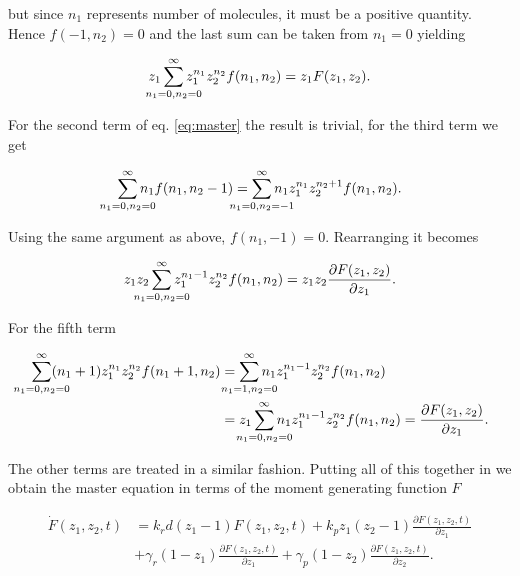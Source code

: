 but since $n_1$ represents number of molecules, it must be a positive quantity. Hence $f(-1,n_2)=0$ and the last sum can be taken from $n_1=0$ yielding

\begin{equation*}
  z_1 \sum_{\mathclap{n_1=0,n_2=0}}^\infty z_1^{n_1}z_2^{n_2}f(n_1,n_2) = z_1F(z_1,z_2).
\end{equation*}

For the second term of eq. \eqref{eq:master} the result is trivial, for the third term we get

\begin{equation*}
  \sum_{\mathclap{n_1=0,n_2=0}}^\infty n_1f(n_1,n_2-1) = \sum_{\mathclap{n_1=0,n_2=-1}}^\infty n_1z_1^{n_1}z_2^{n_2+1}f(n_1,n_2).
\end{equation*}

Using the same argument as above, $f(n_1,-1) = 0$. Rearranging it becomes

\begin{equation*}
  z_1 z_2 \sum_{\mathclap{n_1=0,n_2=0}}^\infty z_1^{n_1-1}z_2^{n_2}f(n_1,n_2) = z_1 z_2 \frac{\partial F(z_1,z_2)}{\partial z_1}.
\end{equation*}

For the fifth term

\begin{equation*}
  \begin{split}
    \sum_{\mathclap{n_1=0,n_2=0}}^\infty (n_1+1)z_1^{n_1}z_2^{n_2}f(n_1+1,n_2) &= \sum_{\mathclap{n_1=1,n_2=0}}^\infty n_1z_1^{n_1-1}z_2^{n_2}f(n_1,n_2)\\ 
    &= z_1 \sum_{\mathclap{n_1=0,n_2=0}}^\infty n_1z_1^{n_1-1}z_2^{n_2}f(n_1,n_2) = \frac{\partial F(z_1,z_2)}{\partial z_1}.
  \end{split}
\end{equation*}

The other terms are treated in a similar fashion. Putting all of this together in we obtain the master equation in terms of the moment generating function $F$

\begin{equation}
  \label{eq:masterF}
  \begin{split}
    \dot{F}(z_1,z_2,t) &= k_rd(z_1-1)F(z_1,z_2,t) + k_pz_1(z_2-1)\frac{\partial F(z_1,z_2,t)}{\partial z_1} \\
    &+ \gamma_r(1-z_1)\frac{\partial F(z_1,z_2,t)}{\partial z_1} + \gamma_p(1-z_2)\frac{\partial F(z_1,z_2,t)}{\partial z_2}.
  \end{split}
\end{equation}

